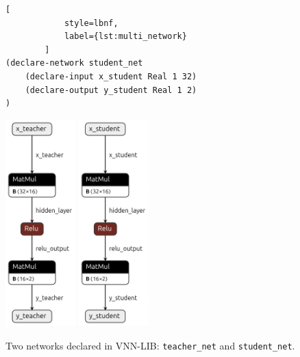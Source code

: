 \begin{figure}[htbp]
\begin{minipage}[c]{0.55\textwidth}
\begin{lstlisting}[
            style=lbnf,
            label={lst:multi_network}
        ]
(declare-network student_net
    (declare-input x_student Real 1 32)
    (declare-output y_student Real 1 2)
)
        \end{lstlisting}
    \end{minipage}
    \begin{minipage}[c]{0.45\textwidth}
        \centering
        \includegraphics[height=8cm]{imgs/teacher_net.onnx.png}
        \vspace{0.5cm} 
        \includegraphics[height=8cm]{imgs/student_net.onnx.png}
        \label{fig:multi_network}
    \end{minipage}
    \caption{Two networks declared in VNN-LIB: \texttt{teacher\_net} and \texttt{student\_net}.}
\end{figure}

